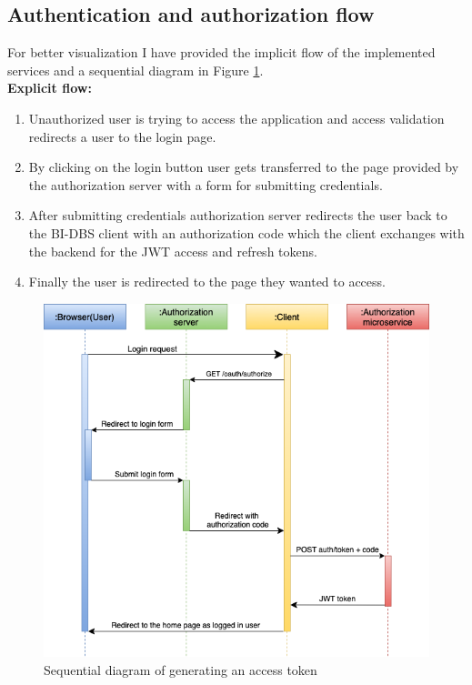 \subsection{Authentication and authorization flow}\label{sec425} For better visualization I have provided the implicit flow of the implemented services and a sequential diagram in Figure \ref{access}.\\

\noindent \textbf{Explicit flow:}

\begin{enumerate}
    \item Unauthorized user is trying to access the application and access validation redirects a user to the login page.
    \item By clicking on the login button user gets transferred to the page provided by the authorization server with a form for submitting credentials.
    \item After submitting credentials authorization server redirects the user back to the BI-DBS client with an authorization code which the client exchanges with the backend for the JWT access and refresh tokens.
    \item Finally the user is redirected to the page they wanted to access.
\end{enumerate}

\begin{figure}[hp]
\centering
\includegraphics[scale=0.56]{../png/generate_token.png}
\caption{Sequential diagram of generating an access token}
\label{access}
\end{figure}



